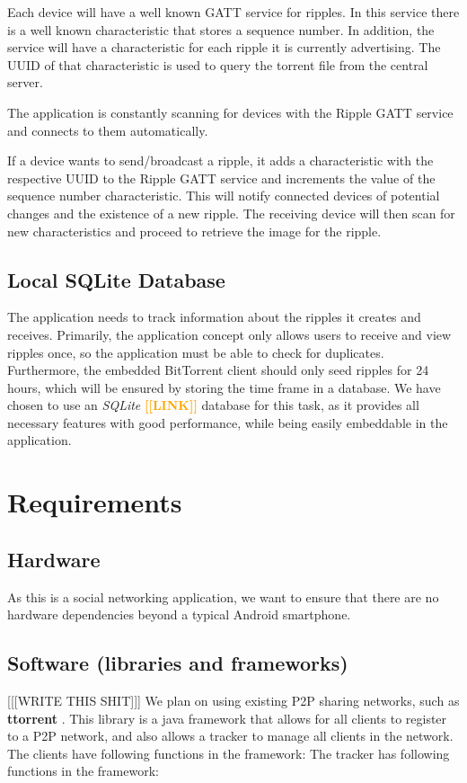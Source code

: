 \documentclass{report}
\newcommand{\todo}[1]{\textsf{\textbf{\textcolor{orange}{[[#1]]}}}}
\begin{document}
Each device will have a well known GATT service for ripples. In this service there is a well known characteristic that stores a sequence number. In addition, the service will have a characteristic for each ripple it is currently advertising. The UUID of that characteristic is used to query the torrent file from the central server.

The application is constantly scanning for devices with the Ripple GATT service and connects to them automatically.

If a device wants to send/broadcast a ripple, it adds a characteristic with the respective UUID to the Ripple GATT service and increments the value of the sequence number characteristic. This will notify connected devices of potential changes and the existence of a new ripple. The receiving device will then scan for new characteristics and proceed to retrieve the image for the ripple.

\subsection{Local SQLite Database}
The application needs to track information about the ripples it creates and receives. Primarily, the application concept only allows users to receive and view ripples once, so the application must be able to check for duplicates. Furthermore, the embedded BitTorrent client should only seed ripples for 24 hours, which will be ensured by storing the time frame in a database.
We have chosen to use an \textit{SQLite} \todo{LINK} database for this task, as it provides all necessary features with good performance, while being easily embeddable in the application.

\section{Requirements}

\subsection{Hardware}
As this is a social networking application, we want to ensure that there are no hardware dependencies beyond a typical Android smartphone.

\subsection{Software (libraries and frameworks)}
[[[WRITE THIS SHIT]]]
We plan on using existing P2P sharing networks, such as \textbf{ttorrent} \cite{ttorrentLink}.
This library is a java framework that allows for all clients to register to a P2P network, and also allows a tracker to manage all clients in the network.
The clients have following functions in the framework:
The tracker has following functions in the framework:
\end{document}
